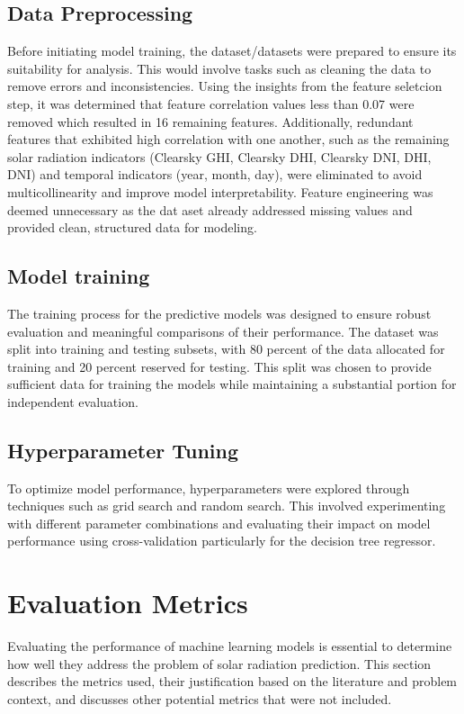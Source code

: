 \documentclass[10pt,twocolumn]{article}
\begin{document}
\begin{itemize}
\subsection{Data Preprocessing}
Before initiating model training, the dataset/datasets were 
prepared to ensure its suitability for analysis. This would involve tasks such as cleaning the data to remove errors and inconsistencies. Using the insights from the feature seletcion step, it was determined that feature correlation values less than 0.07 were removed which resulted in 16 remaining features. Additionally, redundant features that exhibited high correlation with one another, such as the remaining solar radiation indicators (Clearsky GHI, Clearsky DHI, Clearsky DNI, DHI, DNI) and temporal indicators (year, month, day), were eliminated to avoid multicollinearity and improve model interpretability. Feature engineering was deemed unnecessary as the dat
aset already addressed missing values and provided clean, structured data for modeling. 
 
 


\subsection{Model training} The training process for the predictive models was designed to ensure robust evaluation and meaningful comparisons of their performance. The dataset was split into training and testing subsets, with 80 percent of the data allocated for training and 20 percent reserved for testing. This split was chosen to provide sufficient data for training the models while maintaining a substantial portion for independent evaluation.

\subsection{Hyperparameter Tuning}To optimize model performance, hyperparameters were explored through techniques such as grid search and  random search. This involved experimenting with different parameter combinations and evaluating their impact on model performance using cross-validation particularly for the decision tree regressor.



\section*{Evaluation Metrics}

Evaluating the performance of machine learning models is essential to determine how well they address the problem of solar radiation prediction. This section describes the metrics used, their justification based on the literature and problem context, and discusses other potential metrics that were not included.


\end{itemize}
\end{document}

